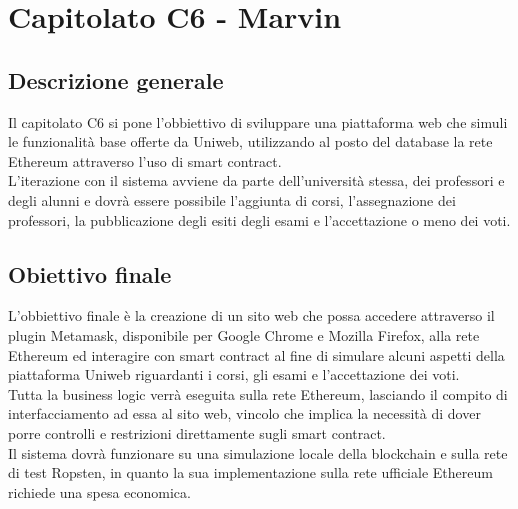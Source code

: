 \documentclass[StudioDiFattibilità.tex]{subfiles}
\begin{document}
\chapter{Capitolato C6 - Marvin}
\section{Descrizione generale}
Il capitolato C6 si pone l'obbiettivo di sviluppare una piattaforma web che simuli le funzionalità base offerte da Uniweb, utilizzando al posto del database la rete Ethereum attraverso l'uso di smart contract.\\
L'iterazione con il sistema avviene da parte dell'università stessa, dei professori e degli alunni e dovrà essere possibile l'aggiunta di corsi, l'assegnazione dei professori, la pubblicazione degli esiti degli esami e l'accettazione o meno dei voti.
\section{Obiettivo finale}
L'obbiettivo finale è la creazione di un sito web che possa accedere attraverso il plugin Metamask, disponibile per Google Chrome e Mozilla Firefox, alla rete Ethereum ed interagire con smart contract al fine di simulare alcuni aspetti della piattaforma Uniweb riguardanti i corsi, gli esami e l'accettazione dei voti.\\
Tutta la business logic verrà eseguita sulla rete Ethereum, lasciando il compito di interfacciamento ad essa al sito web, vincolo che implica la necessità di dover porre controlli e restrizioni direttamente sugli smart contract.\\
Il sistema dovrà funzionare su una simulazione locale della blockchain e sulla rete di test Ropsten, in quanto la sua implementazione sulla rete ufficiale Ethereum richiede una spesa economica.
\end{document}
